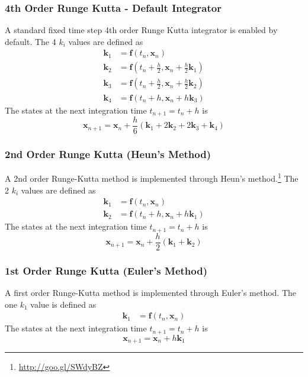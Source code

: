 \subsubsection{4th Order Runge Kutta - Default Integrator}
A standard fixed time step 4th order Runge Kutta integrator is enabled by default.  The 4 $k_{i}$ values are defined as
\begin{align}
	\bm k_{1} &= \bm f(t_{n}, \bm x_{n}) \\
	\bm k_{2} &= \bm f(t_{n} + \frac{h}{2}, \bm x_{n} + \frac{h}{2} \bm k_{1}) \\
	\bm k_{3} &= \bm f(t_{n} + \frac{h}{2}, \bm x_{n} + \frac{h}{2} \bm k_{2}) \\
	\bm k_{4} &= \bm f(t_{n} + h, \bm x_{n} + h \bm k_{3}) 
\end{align}
The states at the next integration time $t_{n+1} = t_{n} + h$ is
\begin{equation}
	\bm x_{n+1} = \bm x_{n} + \frac{h}{6} \left(
		\bm k_{1} + 2 \bm k_{2} + 2 \bm k_{3} + \bm k_{4}
	\right)
\end{equation}


\subsubsection{2nd Order Runge Kutta (Heun's Method)}
A 2nd order Runge-Kutta method is implemented through Heun's method.\footnote{\url{http://goo.gl/SWdyBZ}} The 2 $k_{i}$ values are defined as
\begin{align}
	\bm k_{1} &= \bm f(t_{n}, \bm x_{n}) \\
	\bm k_{2} &= \bm f(t_{n} + h, \bm x_{n} + h \bm k_{1}) 
\end{align}
The states at the next integration time $t_{n+1} = t_{n} + h$ is
\begin{equation}
	\bm x_{n+1} = \bm x_{n} + \frac{h}{2} \left(
		\bm k_{1} +  \bm k_{2}
	\right)
\end{equation}


\subsubsection{1st Order Runge Kutta (Euler's Method)}
A first order Runge-Kutta method is implemented through Euler's method. The one $k_{1}$ value is defined as
\begin{align}
	\bm k_{1} &= \bm f(t_{n}, \bm x_{n}) 
\end{align}
The states at the next integration time $t_{n+1} = t_{n} + h$ is
\begin{equation}
	\bm x_{n+1} = \bm x_{n} + h
		\bm k_{1}
\end{equation}
